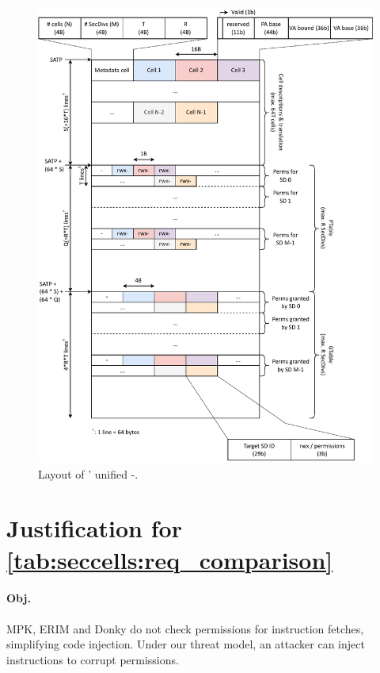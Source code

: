 \begin{figure}
  \centering
  \includegraphics[height=0.95\textheight]{media/seccells/ptable_layout.pdf}
  \caption{Layout of \seccells{}' unified \ptable-\gtable.}
  \label{fig:seccells:ptable_layout}
\end{figure}

\section{Justification for \autoref{tab:seccells:req_comparison}}
\label{app:seccells:justification_table1}

\paragraph{Obj. }
MPK, ERIM and Donky do not check permissions for instruction fetches, 
simplifying code injection.
Under our threat model, an attacker can inject  instructions 
to corrupt permissions.

